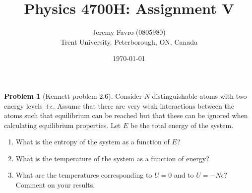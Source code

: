 \documentclass[10pt]{article}
\title{Physics 4700H: Assignment V}
\author{Jeremy Favro (0805980) \\ Trent University, Peterborough, ON, Canada}
\date{\today}
\theoremstyle{definition}
\newtheorem{problem}{Problem}
\begin{document}
\maketitle

\begin{problem}[Kennett problem 2.6] Consider $N$ distinguishable atoms with two energy levels $\pm\epsilon$.
Assume that there are very weak interactions between the atoms such that equilibrium can
be reached but that these can be ignored when calculating equilibrium properties. Let $E$ be
the total energy of the system.
\begin{enumerate}[label=(\alph*)]
  \item What is the entropy of the system as a function of $E$?
  \item What is the temperature of the system as a function of energy?
  \item What are the temperatures corresponding to $U = 0$ and to $U = -N \epsilon$? Comment on
        your results.
\end{enumerate}
\end{problem}
\end{document}
